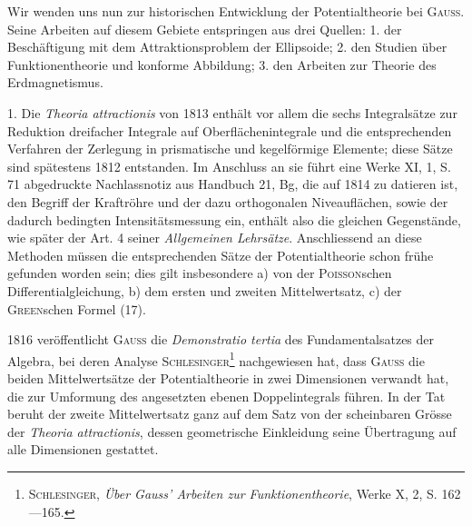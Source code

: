 \clearpage\begingroup{}
\makeatletter\tagsleft@true\let\veqno\@@leqno\makeatother
\renewcommand{\thefootnote}{\arabic{footnote})}\setcounter{footnote}{85}
\begin{center}\end{center}
\noindent\hspace*{\parindent}Wir wenden uns nun zur historischen Entwicklung der Potentialtheorie
bei \textsc{Gauss}. Seine Arbeiten auf diesem Gebiete entspringen aus drei Quellen:
1. der Beschäftigung mit dem Attraktionsproblem der Ellipsoide; 2. den Studien
über Funktionentheorie und konforme Abbildung; 3. den Arbeiten zur Theorie
des Erdmagnetismus.

1. Die \textit{Theoria attractionis} von 1813 enthält vor allem die sechs Integralsätze
zur Reduktion dreifacher Integrale auf Oberflächenintegrale und die
entsprechenden Verfahren der Zerlegung in prismatische und kegelförmige
Elemente; diese Sätze sind spätestens 1812 entstanden. Im Anschluss an
sie führt eine Werke XI, 1, S. 71 abgedruckte Nachlassnotiz aus Handbuch
21, Bg, die auf 1814 zu datieren ist, den Begriff der Kraftröhre und der
dazu orthogonalen Niveauflächen, sowie der dadurch bedingten Intensitätsmessung
ein, enthält also die gleichen Gegenstände, wie später der Art. 4
seiner \textit{Allgemeinen Lehrsätze}. Anschliessend an diese Methoden müssen die
entsprechenden Sätze der Potentialtheorie schon frühe gefunden worden sein;
\clearpage{}
\noindent dies gilt insbesondere a) von der \textsc{Poisson}schen Differentialgleichung, b) dem
ersten und zweiten Mittelwertsatz, c) der \textsc{Green}schen Formel (17).

1816 veröffentlicht \textsc{Gauss} die \textit{Demonstratio tertia} des Fundamentalsatzes
der Algebra, bei deren Analyse \textsc{Schlesinger}\footnote{\textsc{Schlesinger}, \textit{Über Gauss’ Arbeiten zur Funktionentheorie}, Werke X, 2, S. 162—165.} nachgewiesen hat, dass \textsc{Gauss}
die beiden Mittelwertsätze der Potentialtheorie in zwei Dimensionen verwandt
hat, die zur Umformung des angesetzten ebenen Doppelintegrals führen. In
der Tat beruht der zweite Mittelwertsatz ganz auf dem Satz von der scheinbaren
Grösse der \textit{Theoria attractionis}, dessen geometrische Einkleidung seine
Übertragung auf alle Dimensionen gestattet.

